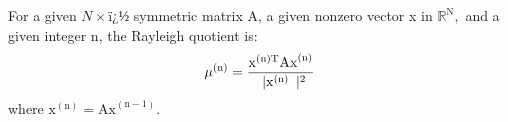 For a given \ensuremath{N \times ï¿½} symmetric matrix A, a given nonzero vector x in
$ \mathbb{R} ^{\mathrm{N}} , $ and a given integer n, the Rayleigh
quotient is:
\[ \mu ^{ ( \mathrm{n} ) } = \frac
{ \mathrm{x}^{ ( \mathrm{n} ) \mathrm{T} } \mathrm{Ax} ^{ ( \mathrm{n} ) } }
{ \\| \mathrm{x} ^{ ( \mathrm{n} ) } \\| ^2 } \]
where $ \mathrm{x}^{ ( \mathrm{n} ) } = \mathrm{Ax} ^{ ( \mathrm{n} -1 ) } . $ 